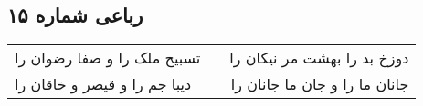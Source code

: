\begin{center}
\section*{رباعی شماره ۱۵}
\label{sec:sh015}
\begin{longtable}{l p{0.5cm} r}
تسبیح ملک را و صفا رضوان را
&&
دوزخ بد را بهشت مر نیکان را
\\
دیبا جم را و قیصر و خاقان را
&&
جانان ما را و جان ما جانان را
\\
\end{longtable}
\end{center}
